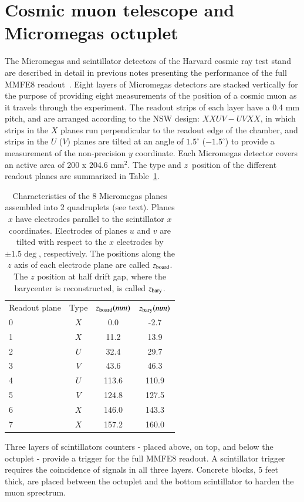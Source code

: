 \section{Cosmic muon telescope and Micromegas octuplet}
\label{sec:exp}

The Micromegas and scintillator detectors of the Harvard cosmic ray test stand are described in detail in previous notes presenting 
the performance of the full MMFE8 readout~\cite{noisy,noiseless}. Eight layers of Micromegas detectors are stacked vertically for the
 purpose of providing eight measurements of the position of a cosmic muon as it travels through the experiment.
 The readout strips of each layer have a 0.4 mm pitch, and are arranged according to the NSW design: $XXUV-UVXX$, in which strips in the $X$ planes run
 perpendicular to the readout edge of the chamber, and strips in the $U$ ($V$) planes are tilted at
 an angle of $1.5^\circ$ ($-1.5^\circ$) to provide a measurement of the non-precision $y$ coordinate. Each Micromegas detector covers an active area of
 200 x 204.6 mm$^2$.
The type and $z$~position of the different readout
 planes are summarized in Table~\ref{tab:tab_1}.
\begin{table}
 \begin{center}
 \begin{tabular}{lccc}
 \hline \hline
  Readout plane  &  Type & $z_{\rm board} (mm)$ &  $z_{\rm bary} (mm)$      \\
  0      & $X$   &  0.0 &  -2.7     \\ 
  1      & $X$  & 11.2 &   13.9  \\
  2      & $U$   &32.4 &   29.7 \\
  3      & $V$   & 43.6 &    46.3   \\
  4      & $U$   & 113.6 &    110.9    \\
  5      & $V$   & 124.8 &   127.5  \\
  6      & $X$   & 146.0 &    143.3   \\
  7      & $X$   & 157.2 &    160.0   \\
 \hline \hline
 \end{tabular}
 \caption{ Characteristics of the 8 Micromegas planes assembled into 2 quadruplets (see text).
 Planes $x$ have electrodes parallel to the scintillator $x$ coordinates. Electrodes of planes $u$ and $v$ are 
tilted with respect to the $x$ electrodes by $\pm 1.5 \deg$, respectively. The  positions
along the $z$ axis of each electrode plane are called  $z_{\rm board}$. 
The $z$ position at half drift gap, where the barycenter is reconstructed, is called $z_{\rm bary}$. 
 }
\label{tab:tab_1}
 \end{center}
\end{table}
Three layers of scintillators counters -  placed above, on top, and below the octuplet -  provide a trigger
for the full MMFE8 readout. A scintillator trigger requires the coincidence of signals in all three layers. 
 Concrete blocks, 5 feet thick, are placed between the octuplet and the bottom scintillator to harden the muon sprectrum.

